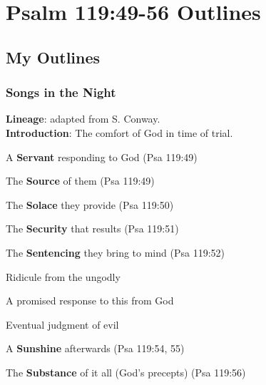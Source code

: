 \section{Psalm 119:49-56 Outlines}

\subsection{My Outlines}

\subsubsection{Songs in the Night}
\textbf{Lineage}: adapted from S. Conway.\\
\textbf{Introduction}: The comfort of God in time of trial.
\begin{compactenum}[I.]
\item A \textbf{Servant} responding to God  (Psa 119:49)
\item The \textbf{Source} of them  (Psa 119:49)
\item The \textbf{Solace} they provide  (Psa 119:50)
\item The \textbf{Security} that results   (Psa 119:51)
\item The \textbf{Sentencing} they bring to mind (Psa 119:52)
\begin{compactenum}[A.]
\item Ridicule from the ungodly
\item A promised response to this from God
\item Eventual judgment of evil
\end{compactenum}
\item A \textbf{Sunshine} afterwards  (Psa 119:54, 55)
\item The \textbf{Substance} of it all (God's precepts)  (Psa 119:56)
\end{compactenum}

